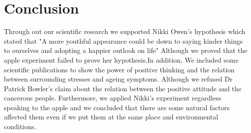 \documentclass[12pt]{article}
\theoremstyle{plain}
\theoremstyle{definition}
\theoremstyle{remark}
\begin{document}
\section{Conclusion}
\label{sec:concl}

Through out our scientific research we supported Nikki Owen's hypothesis which stated that "A more youthful appearance could be down to saying kinder things to ourselves and adopting a happier outlook on life" Although we proved that the apple experiment failed to prove her hypothesis.In addition, We included some scientific publications to show the power of positive thinking and the relation between surrounding stresses and ageing symptoms. Although we refused Dr Patrick Bowler's claim about the relation between the positive attitude and the cancerous people. Furthermore, we applied Nikki's experiment regardless speaking to the apple and we concluded that there are some natural factors affected them even if we put them at the same place and environmental conditions.  


%
%


\end{document}
